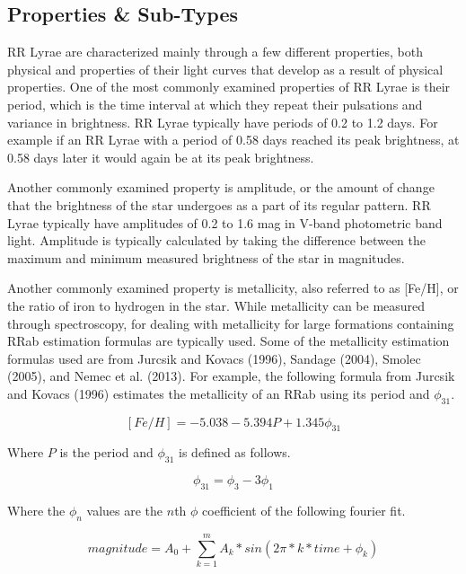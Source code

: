 \documentclass[]{article}
\begin{document}
\subsection{Properties \& Sub-Types}

RR Lyrae are characterized mainly through a few different properties, both physical and properties of their light curves that develop as a result of physical properties. One of the most commonly examined properties of RR Lyrae is their period, which is the time interval at which they repeat their pulsations and variance in brightness. RR Lyrae typically have periods of 0.2 to 1.2 days. \cite{szczygiel_2009} For example if an RR Lyrae with a period of 0.58 days reached its peak brightness, at 0.58 days later it would again be at its peak brightness.

Another commonly examined property is amplitude, or the amount of change that the brightness of the star undergoes as a part of its regular pattern. RR Lyrae typically have amplitudes of 0.2 to 1.6 mag in V-band photometric band light. \cite{szczygiel_2009} Amplitude is typically calculated by taking the difference between the maximum and minimum measured brightness of the star in magnitudes. \cite{richards_2011}

Another commonly examined property is metallicity, also referred to as [Fe/H], or the ratio of iron to hydrogen in the star. \cite{jurcsik_1995} While metallicity can be measured through spectroscopy, for dealing with metallicity for large formations containing RRab estimation formulas are typically used. Some of the metallicity estimation formulas used are from Jurcsik and Kovacs (1996), Sandage (2004), Smolec (2005), and Nemec et al. (2013). \cite{jurcsik_1996, sandage_2004, smolec_2005, nemec_2013} For example, the following formula from Jurcsik and Kovacs (1996) estimates the metallicity of an RRab using its period and $\phi_{31}$. \cite{jurcsik_1996}

$$
[Fe/H] = -5.038 - 5.394 P + 1.345 \phi_{31}
$$

Where $P$ is the period and $\phi_{31}$ is defined as follows. \cite{bhardwaj_2018}

$$
\phi_{31} = \phi_{3} - 3\phi_{1}
$$

Where the $\phi_{n}$ values are the $n$th $\phi$ coefficient of the following fourier fit.

$$
magnitude = A_{0} + \sum_{k=1}^{m} A_k * sin(2\pi * k * time + \phi_{k})
$$
\end{document}

